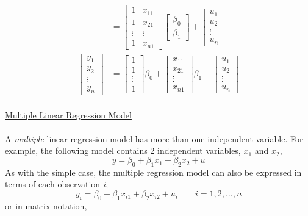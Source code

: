 \documentclass[12pt]{report}
\newenvironment{blueframed}[1][blue]
{\def\FrameCommand{\fboxsep=\FrameSep\fcolorbox{#1}{white}}%
\MakeFramed {\advance\hsize-\width \FrameRestore}}
{\endMakeFramed}
\begin{document}
\begin{blueframed}
{\begin{align*}
	&=
	\begin{bmatrix}
	1 & x_{11} \\
	1 & x_{21} \\
	\vdots & \vdots \\
	1 & x_{n1}  
	\end{bmatrix}
	\begin{bmatrix}
	\beta_0 \\
	\beta_1
	\end{bmatrix}
	+
	\begin{bmatrix}
	u_{1} \\
	u_{2} \\
	\vdots \\
	u_{n} 
	\end{bmatrix} \\
	\begin{bmatrix}
	y_{1} \\
	y_{2} \\
	\vdots \\
	y_{n} 
	\end{bmatrix}
	&= 
	\begin{bmatrix}
	1 \\
	1 \\
	\vdots \\
	1   
	\end{bmatrix}
	\beta_0
	+
	\begin{bmatrix}
	x_{11} \\
	x_{21} \\
	\vdots \\
	x_{n1}   
	\end{bmatrix}
	\beta_1
	+
	\begin{bmatrix}
	u_{1} \\
	u_{2} \\
	\vdots \\
	u_{n} 
	\end{bmatrix}
	\end{align*}\\
	\uline{Multiple Linear Regression Model} \\ \\
	A \textit{multiple} linear regression model has more than one independent variable. For example, the following model contains 2 independent variables, $x_1$ and $x_2$,
	$$y = \beta_0+\beta_1x_{1}+\beta_2x_{2}+u$$
	As with the simple case, the multiple regression model can also be expressed in terms of each observation \textit{i},
	$$y_i = \beta_0+\beta_1x_{i1}+\beta_2x_{i2}+u_i \qquad i=1,2,\dots,n$$
	or in matrix notation,
	\begin{align*}

\end{align*}}
\end{blueframed}
\end{document}
